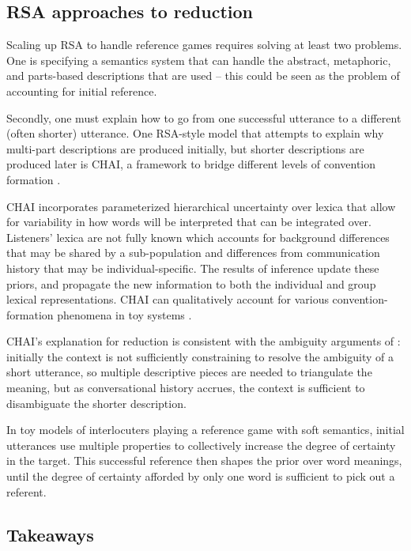 \documentclass[]{article}
\begin{document}
 

\subsection{RSA approaches to reduction}
Scaling up RSA to handle reference games requires solving at least two problems. One is specifying a semantics system that can handle the abstract, metaphoric, and parts-based descriptions that are used -- this could be seen as the problem of accounting for initial reference. 

Secondly, one must explain how to go from one successful utterance to a different (often shorter) utterance. One RSA-style model that attempts to explain why multi-part descriptions are produced initially, but shorter descriptions are produced later is CHAI,  a framework to bridge different levels of convention formation \citep{hawkins2021}.

CHAI incorporates parameterized hierarchical uncertainty over lexica that allow for variability in how words will be interpreted that can be integrated over. Listeners' lexica are not fully known which accounts for background differences that may be shared by a sub-population and differences from communication history that may be individual-specific. The results of inference update these priors, and propagate the new information to both the individual and group lexical representations. CHAI can qualitatively account for various convention-formation phenomena in toy systems \citep{hawkins2021}.

CHAI's explanation for reduction is consistent with the ambiguity arguments of \citet{piantadosi2012}: initially the context is not sufficiently constraining to resolve the ambiguity of a short utterance, so multiple descriptive pieces are needed to triangulate the meaning, but as conversational history accrues, the context is sufficient to disambiguate the shorter description. 

In toy models of interlocuters playing a reference game with soft semantics, initial utterances use multiple properties to collectively increase the degree of certainty in the target. This successful reference then shapes the prior over word meanings, until the degree of certainty afforded by only one word is sufficient to pick out a referent. 



\subsection{Takeaways}
\end{document}
